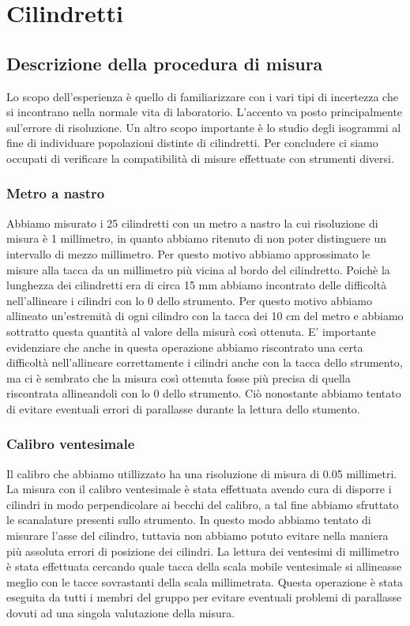 \section{Cilindretti}

\subsection{Descrizione della procedura di misura}

Lo scopo dell'esperienza è quello di familiarizzare con i vari tipi di
incertezza che si incontrano nella normale vita di laboratorio.
L'accento va posto principalmente sul'errore di risoluzione.
Un altro scopo importante è lo studio degli isogrammi al fine di individuare
popolazioni distinte di cilindretti. Per concludere ci siamo occupati di verificare
la compatibilità di misure effettuate con strumenti diversi.

\subsubsection{Metro a nastro}

Abbiamo misurato i 25 cilindretti con un metro a nastro la cui risoluzione
di misura è 1 millimetro, in quanto abbiamo ritenuto di non poter distinguere
un intervallo di mezzo millimetro. Per questo motivo abbiamo approssimato
le misure alla tacca da un millimetro più vicina al bordo del cilindretto.
Poichè la lunghezza dei cilindretti era di circa 15 mm abbiamo incontrato
delle difficoltà nell'allineare i cilindri con lo 0 dello strumento.
Per questo motivo abbiamo allineato un'estremità di ogni cilindro con la
tacca dei 10 cm del metro e abbiamo sottratto questa quantità al valore
della misurà così ottenuta. E' importante evidenziare che anche in questa
operazione abbiamo riscontrato una certa difficoltà nell'allineare correttamente
i cilindri anche con la tacca dello strumento, ma ci è sembrato che la
misura così ottenuta fosse più precisa di quella riscontrata allineandoli
con lo 0 dello strumento. Ciò nonostante abbiamo tentato di evitare
eventuali errori di parallasse durante la lettura dello stumento.

\subsubsection{Calibro ventesimale}

Il calibro che abbiamo utillizzato ha una risoluzione di misura di 0.05
millimetri. La misura con il calibro ventesimale è stata effettuata avendo
cura di disporre i cilindri in modo perpendicolare ai becchi del calibro,
a tal fine abbiamo sfruttato le scanalature presenti sullo strumento.
In questo modo abbiamo tentato di misurare l'asse del cilindro, tuttavia
non abbiamo potuto evitare nella maniera più assoluta errori di posizione
dei cilindri.
La lettura dei ventesimi di millimetro è stata effettuata cercando quale
tacca della scala mobile ventesimale si allineasse meglio con le tacce
sovrastanti della scala millimetrata. Questa operazione è stata eseguita
da tutti i membri del gruppo per evitare eventuali problemi di parallasse
dovuti ad una singola valutazione della misura.

